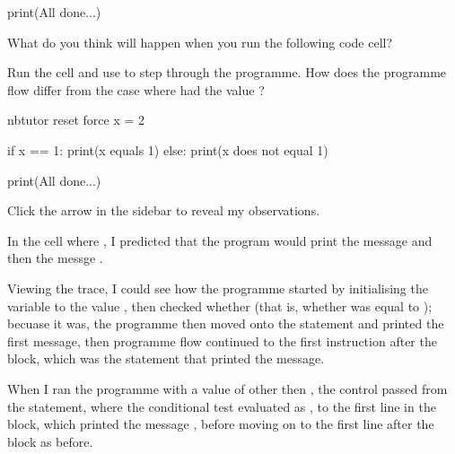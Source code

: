 \documentclass[letterpaper,10pt,english]{sphinxmanual}
\begin{document}
{{\begin{sphinxVerbatim}[commandchars=\\\{\}]
print(\PYGZdq{}All done...\PYGZdq{})
\end{sphinxVerbatim}
}


What do you think will happen when you run the following code cell?

Run the cell and use  to step through the programme. How does the programme flow differ from the case where  had the value ?

{
\begin{sphinxVerbatim}[commandchars=\\\{\}]
\llap{\color{nbsphinxin}[ ]:\,\hspace{\fboxrule}\hspace{\fboxsep}}\PYGZpc{}\PYGZpc{}nbtutor \PYGZhy{}\PYGZhy{}reset \PYGZhy{}\PYGZhy{}force
x = 2

if x == 1:
    print(\PYGZdq{}x equals 1\PYGZdq{})
else:
    print(\PYGZdq{}x does not equal 1\PYGZdq{})

print(\PYGZdq{}All done...\PYGZdq{})
\end{sphinxVerbatim}
}

Click the arrow in the sidebar to reveal my observations.

In the cell where , I predicted that the program would print the message  and then the messge .

Viewing the trace, I could see how the programme started by initialising the  variable to the value , then checked whether  (that is, whether  was equal to ); becuase it was, the programme then moved onto the  statement and printed the first message, then programme flow continued to the first instruction after the  block, which was the statement that printed the  message.

When I ran the programme with a value of  other then , the control passed from the  statement, where the conditional test evaluated as , to the first line in the  block, which printed the message , before moving on to the first line after the  block as before.


}
\end{document}
